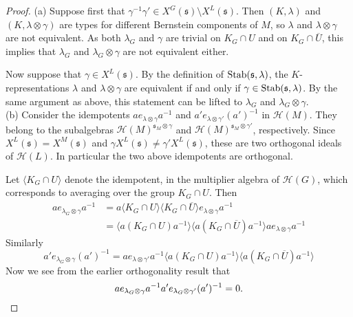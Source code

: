 \documentclass[11pt]{amsart}
\theoremstyle{definition}
\begin{document}
\begin{proof}
(a) Suppose first that $\gamma^{-1} \gamma' \in X^G ({{\mathfrak s}}) \setminus X^L ({{\mathfrak s}})$. 
Then $(K,\lambda)$ and $(K,\lambda \otimes \gamma)$ are types for different Bernstein 
components of $M$, so $\lambda$ and $\lambda \otimes \gamma$ are not equivalent. 
As both $\lambda_G$ and $\gamma$ are trivial on $K_G \cap U$ and on 
$K_G \cap \overline{U}$, this implies that $\lambda_G$ and $\lambda_G \otimes \gamma$ 
are not equivalent either.

Now suppose that $\gamma \in X^L ({{\mathfrak s}})$. By the definition of ${{\rm Stab}} ({{\mathfrak s}},\lambda)$, the
$K$-representations $\lambda$ and $\lambda \otimes \gamma$ are equivalent if and only
if $\gamma \in {{\rm Stab}} ({{\mathfrak s}},\lambda)$. By the same argument as above, this statement can be
lifted to $\lambda_G$ and $\lambda_G \otimes \gamma$.\\
(b) Consider the idempotents $a e_{\lambda \otimes \gamma} 
a^{-1}$ and $a' e_{\lambda \otimes \gamma'} (a')^{-1}$ in ${{\mathcal H}} (M)$.
They belong to the subalgebras ${{\mathcal H}} (M)^{{{\mathfrak s}}_M \otimes \gamma}$ and
${{\mathcal H}} (M)^{{{\mathfrak s}}_M \otimes \gamma'}$, respectively. Since $X^L ({{\mathfrak s}}) = X^M ({{\mathfrak s}})$ and
$\gamma X^L ({{\mathfrak s}}) \neq \gamma' X^L ({{\mathfrak s}})$, these are two orthogonal ideals of ${{\mathcal H}} (L)$.
In particular the two above idempotents are orthogonal. 

Let $\langle K_G \cap U \rangle$ denote the idempotent, in the multiplier algebra of
${{\mathcal H}} (G)$, which corresponds to averaging over the group $K_G \cap U$. Then 
\begin{align*}
a e_{\lambda_G \otimes \gamma} a^{-1} & = a \langle K_G \cap U \rangle 
\langle K_G \cap \overline{U} \rangle e_{\lambda \otimes \gamma} a^{-1} \\
& = \langle a (K_G \cap U) a^{-1} \rangle \langle a( K_G \cap \overline{U}) a^{-1} \rangle 
a e_{\lambda \otimes \gamma} a^{-1} 
\end{align*}
Similarly
\[
a' e_{\lambda_G \otimes \gamma} (a')^{-1} = 
a e_{\lambda \otimes \gamma'} a^{-1}
\langle a (K_G \cap U) a^{-1} \rangle \langle a( K_G \cap \overline{U}) a^{-1} \rangle 
\]
Now we see from the earlier orthogonality result that 
\[
a e_{\lambda_G \otimes \gamma} a^{-1} a' e_{\lambda_G \otimes \gamma'} (a')^{-1} 
= 0 . \qedhere
\]
\end{proof}
\end{document}
